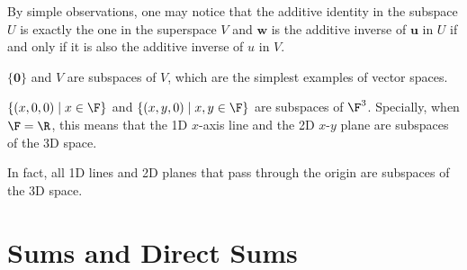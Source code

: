 \documentclass[thmcnt=section, color=cyan, 12pt]{my-elegantbook}
\begin{document}
By simple observations,
one may notice that the additive identity in the subspace $U$
is exactly the one in the superspace $V$
and $\mathbf{w}$ is the additive inverse of $\mathbf{u}$ in $U$ if and only if
it is also the additive inverse of $u$ in $V$.

\begin{example}
	$\{\mathbf{0}\}$ and $V$ are subspaces of $V$,
	which are the simplest examples of vector spaces.
\end{example}

\begin{example}
	$\{(x, 0, 0) \mid x \in \F\}$ and $\{(x, y, 0) \mid x, y \in \F\}$
	are subspaces of $\F^3$.
	Specially, when $\F = \R$, this means that
	the 1D $x$-axis line and the
	2D $x$-$y$ plane are subspaces of
	the 3D space.

	In fact, all 1D lines and 2D planes that pass through the origin
	are subspaces of the 3D space.
\end{example}



\section{Sums and Direct Sums}




\printbibliography[heading=bibintoc, title=References]


\printindex
\end{document}
